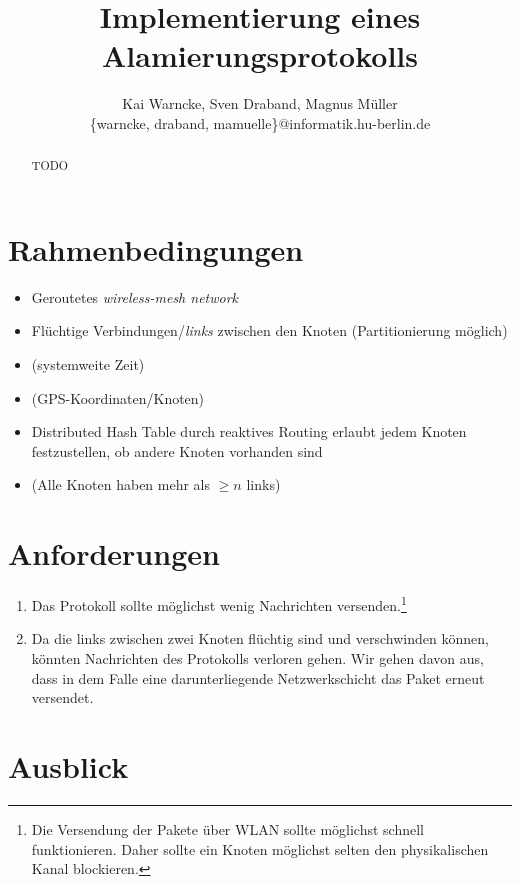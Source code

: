 \documentclass[a4paper,10pt,fleqn]{scrartcl}
\title{Implementierung eines Alamierungsprotokolls}
\author{Kai Warncke, Sven Draband, Magnus Müller \\
\{warncke, draband, mamuelle\}@informatik.hu-berlin.de
}
\theoremstyle{break}
\begin{document}
\maketitle
\tableofcontents
\begin{abstract}
  TODO
\end{abstract}
\section{Rahmenbedingungen}
    \begin{itemize}
      \item Geroutetes \emph{wireless-mesh network}
      \item Flüchtige Verbindungen/\emph{links} zwischen den Knoten (Partitionierung
        möglich)
      \item (systemweite Zeit)
      \item (GPS-Koordinaten/Knoten)
      \item Distributed Hash Table durch reaktives Routing erlaubt jedem Knoten
        festzustellen, ob andere Knoten vorhanden sind
      \item (Alle Knoten haben mehr als $\geq n$ links)
    \end{itemize}
\section{Anforderungen}
\begin{enumerate}
  \item Das Protokoll sollte möglichst wenig Nachrichten versenden.\footnote{Die
    Versendung der Pakete über WLAN sollte möglichst schnell funktionieren. Daher sollte
    ein Knoten möglichst selten den physikalischen Kanal blockieren.}
    \label{anf:min_msg}
  \item Da die links zwischen zwei Knoten flüchtig sind und verschwinden können, könnten
    Nachrichten des Protokolls verloren gehen. Wir gehen davon aus, dass in dem Falle eine
    darunterliegende Netzwerkschicht das Paket erneut versendet.
    \label{anf:tcp}
\end{enumerate}

\section{Ausblick}
\end{document}
